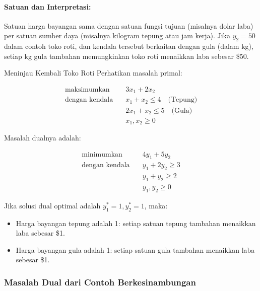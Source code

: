 \paragraph{Satuan dan Interpretasi:}
Satuan harga bayangan sama dengan satuan fungsi tujuan (misalnya dolar laba) per satuan sumber daya (misalnya kilogram tepung atau jam kerja). Jika $y_2 = 50$ dalam contoh toko roti, dan kendala tersebut berkaitan dengan gula (dalam kg), setiap kg gula tambahan memungkinkan toko roti menaikkan laba sebesar \$50.

\begin{example}{Meninjau Kembali Toko Roti}{}
Perhatikan masalah primal:

$$
\begin{aligned}
\text{maksimumkan} \quad & 3x_1 + 2x_2 \\
\text{dengan kendala} \quad
& x_1 + x_2 \leq 4 \quad \text{(Tepung)} \\
& 2x_1 + x_2 \leq 5 \quad \text{(Gula)} \\
& x_1, x_2 \geq 0
\end{aligned}
$$

Masalah dualnya adalah:

$$
\begin{aligned}
\text{minimumkan} \quad & 4y_1 + 5y_2 \\
\text{dengan kendala} \quad
& y_1 + 2y_2 \geq 3 \\
& y_1 + y_2 \geq 2 \\
& y_1, y_2 \geq 0
\end{aligned}
$$

Jika solusi dual optimal adalah $y_1^* = 1, y_2^* = 1$, maka:

\begin{itemize}
\item Harga bayangan tepung adalah 1: setiap satuan tepung tambahan menaikkan laba sebesar \$1.
\item Harga bayangan gula adalah 1: setiap satuan gula tambahan menaikkan laba sebesar \$1.
\end{itemize}
\end{example}

\subsubsection*{Masalah Dual dari Contoh Berkesinambungan}

